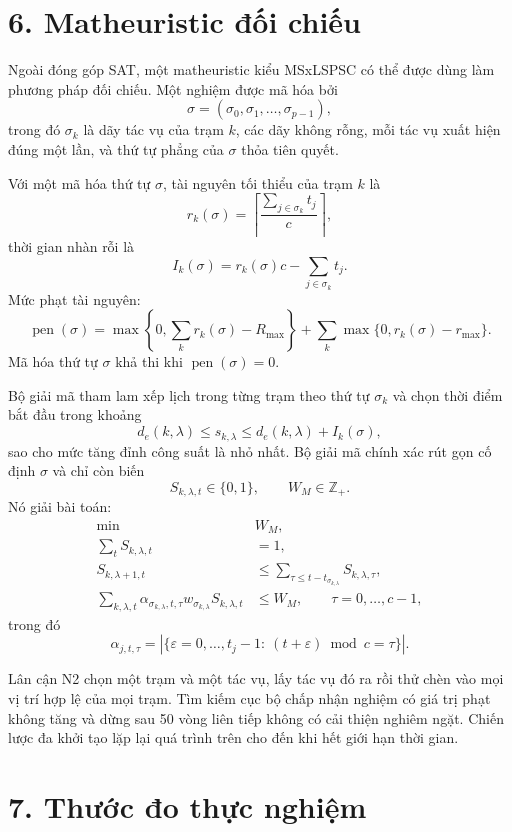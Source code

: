 \documentclass[12pt]{article}
\begin{document}
\section*{6. Matheuristic đối chiếu}

Ngoài đóng góp SAT, một matheuristic kiểu MSxLSPSC có thể được dùng làm phương pháp đối chiếu. Một nghiệm được mã hóa bởi
\[
\sigma=(\sigma_0,\sigma_1,\ldots,\sigma_{p-1}),
\]
trong đó $\sigma_k$ là dãy tác vụ của trạm $k$, các dãy không rỗng, mỗi tác vụ xuất hiện đúng một lần, và thứ tự phẳng của $\sigma$ thỏa tiên quyết.

Với một mã hóa thứ tự $\sigma$, tài nguyên tối thiểu của trạm $k$ là
\[
r_k(\sigma)=
\left\lceil
\frac{\sum_{j\in\sigma_k}t_j}{c}
\right\rceil,
\]
thời gian nhàn rỗi là
\[
I_k(\sigma)=r_k(\sigma)c-\sum_{j\in\sigma_k}t_j.
\]
Mức phạt tài nguyên:
\[
\operatorname{pen}(\sigma)
=
\max\left\{0,\sum_k r_k(\sigma)-R_{\max}\right\}
+
\sum_k \max\{0,r_k(\sigma)-r_{\max}\}.
\tag{MH\_1}
\]
Mã hóa thứ tự $\sigma$ khả thi khi $\operatorname{pen}(\sigma)=0$.

Bộ giải mã tham lam xếp lịch trong từng trạm theo thứ tự $\sigma_k$ và chọn thời điểm bắt đầu trong khoảng
\[
d_e(k,\lambda)
\le s_{k,\lambda}
\le
d_e(k,\lambda)+I_k(\sigma),
\]
sao cho mức tăng đỉnh công suất là nhỏ nhất. Bộ giải mã chính xác rút gọn cố định $\sigma$ và chỉ còn biến
\[
S_{k,\lambda,t}\in\{0,1\},\qquad W_M\in\mathbb{Z}_{+}.
\]
Nó giải bài toán:
\begin{align}
\min\;&W_M,\\
\sum_{t}S_{k,\lambda,t}&=1,\\
S_{k,\lambda+1,t}
&\le
\sum_{\tau\le t-t_{\sigma_{k,\lambda}}}
S_{k,\lambda,\tau},\\
\sum_{k,\lambda,t}
\alpha_{\sigma_{k,\lambda},t,\tau}
w_{\sigma_{k,\lambda}}S_{k,\lambda,t}
&\le W_M,
\qquad \tau=0,\ldots,c-1,
\end{align}
trong đó
\[
\alpha_{j,t,\tau}
=
\left|
\{\varepsilon=0,\ldots,t_j-1:\ (t+\varepsilon)\bmod c=\tau\}
\right|.
\]

Lân cận N2 chọn một trạm và một tác vụ, lấy tác vụ đó ra rồi thử chèn vào mọi vị trí hợp lệ của mọi trạm. Tìm kiếm cục bộ chấp nhận nghiệm có giá trị phạt không tăng và dừng sau 50 vòng liên tiếp không có cải thiện nghiêm ngặt. Chiến lược đa khởi tạo lặp lại quá trình trên cho đến khi hết giới hạn thời gian.

\section*{7. Thước đo thực nghiệm}
\end{document}
